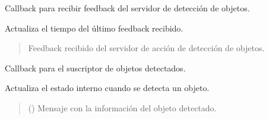 \documentclass[a4paper,10pt,spanish]{sphinxmanual}
\begin{document}
\begin{fulllineitems}
\begin{fulllineitems}
\end{fulllineitems}


\begin{fulllineitems}
\label{\detokenize{squad_state_manager:squad_state_manager.EstadoExploracion.feedback_cb}}
\pysigstartsignatures
{}
\pysigstopsignatures
\sphinxAtStartPar
Callback para recibir feedback del servidor de detección de objetos.

\sphinxAtStartPar
Actualiza el tiempo del último feedback recibido.
\begin{quote}\begin{description}
\sphinxAtStartPar
{} \textendash{} Feedback recibido del servidor de acción de detección de objetos.

\end{description}\end{quote}

\end{fulllineitems}


\begin{fulllineitems}
\label{\detokenize{squad_state_manager:squad_state_manager.EstadoExploracion.object_callback}}
\pysigstartsignatures
{}
\pysigstopsignatures
\sphinxAtStartPar
Callback para el suscriptor de objetos detectados.

\sphinxAtStartPar
Actualiza el estado interno cuando se detecta un objeto.
\begin{quote}\begin{description}
\sphinxAtStartPar
{} () \textendash{} Mensaje con la información del objeto detectado.

\end{description}\end{quote}

\end{fulllineitems}


\end{fulllineitems}
\end{document}

